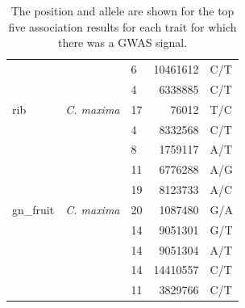 \documentclass[utf8]{frontiers_suppmat} %
\begin{document}
\begin{table}[ht]
\begin{tabular}{lllrl}
	 	&  & 6 & 10461612 & C/T \\ 
		&  & 4 & 6338885 & C/T \\ 
		\hline
		rib & \textit{C. maxima} & 17 & 76012 & T/C \\ 
		 & & 4 & 8332568 & C/T \\ 
		 &  & 8 & 1759117 & A/T \\ 
		 & & 11 & 6776288 & A/G \\ 
		 &  & 19 & 8123733 & A/C \\ 
		\hline
		gn\_fruit & \textit{C. maxima} & 20 & 1087480 & G/A \\ 
		 &  & 14 & 9051301 & G/T \\ 
		 &  & 14 & 9051304 & A/T \\ 
		 &  & 14 & 14410557 & C/T \\ 
		 & & 11 & 3829766 & C/T \\ 
		\hline
	\end{tabular}
	\caption{The position and allele are shown for the top five association results for each trait for which there was a GWAS signal.}
\end{table}
\end{document}
